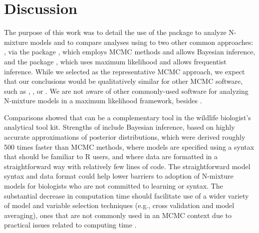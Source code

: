 \documentclass[codesnippet]{jss}
\begin{document}
\section[Discussion]{Discussion}
The purpose of this work was to detail the use of the  package \citep{Rue_Riebler_Sorbye_Illian_Simpson_Lindgren_2017} to analyze N-mixture models and to compare analyses using  to two other common approaches:  \citep{plummer2003jags,Lunn_Jackson_Best_Thomas_Spiegelhalter_2012}, via the  package \citep{Denwood_2016}, which employs MCMC methods and allows Bayesian inference, and the  package \citep{Fiske_Chandler_2011}, which uses maximum likelihood and allows frequentist inference. While we selected  as the representative MCMC approach, we expect that our conclusions would be qualitatively similar for other MCMC software, such as , , or . We are not aware of other commonly-used software for analyzing N-mixture models in a maximum likelihood framework, besides .

Comparisons showed that  can be a complementary tool in the wildlife biologist's analytical tool kit. Strengths of  include Bayesian inference, based on highly accurate approximations of posterior distributions, which were derived roughly 500 times faster than MCMC methods, where models are specified using a syntax that should be familiar to R users, and where data are formatted in a straightforward way with relatively few lines of code. The straightforward model syntax and data format could help lower  barriers to adoption of N-mixture models for biologists who are not committed to learning   or  syntax. The substantial decrease in computation time should facilitate use of a wider variety of model and variable selection techniques (e.g., cross validation and model averaging), ones that are not commonly used in an MCMC context due to practical issues related to computing time \citep{Kery_Schaub_2011}.
\end{document}
